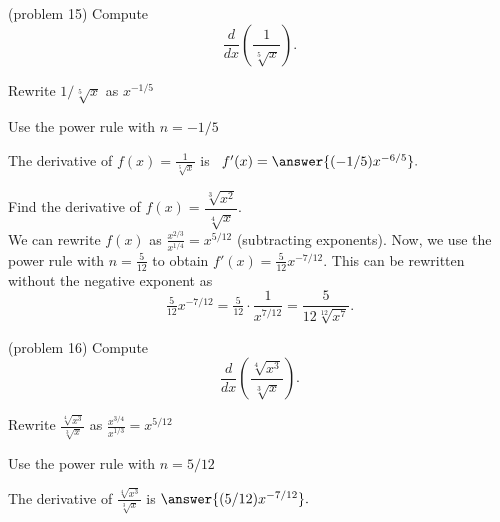 \documentclass{ximera}
\begin{document}
\begin{problem}(problem 15)
Compute
\[
\frac{d}{dx} \left(\frac{1}{\sqrt[5] x}\right).
\]
\begin{hint}
Rewrite $1/\sqrt[5] x$ as $x^{-1/5}$
\end{hint}
\begin{hint}
Use the power rule with $n = -1/5$
\end{hint}
The derivative of $f(x) = \frac{1}{\sqrt[5] x}$ is \ $f'(x) = \answer{(-1/5) x^{-6/5}}.$
\end{problem}




\begin{example}[example 16]
Find the derivative of $f(x) = \dfrac{\sqrt[3] {x^2}}{\sqrt[4] x}.$\\
We can rewrite $f(x)$ as $\frac{x^{2/3}}{x^{1/4}} = x^{5/12}$ 
(subtracting exponents). Now, we use the power rule with $n = \frac{5}{12}$ to obtain $f'(x) = \tfrac{5}{12}x^{-7/12}.$
This can be rewritten without the negative exponent as
\[
\tfrac{5}{12}x^{-7/12} = \tfrac{5}{12} \cdot \frac{1}{x^{7/12}} = \frac{5}{12\sqrt[12]{x^7}}.
\]
\end{example}




\begin{problem}(problem 16)
Compute
\[
\frac{d}{dx} \left(\frac{\sqrt[4] {x^3}}{\sqrt[3] x}\right).
\]
\begin{hint}
Rewrite $\frac{\sqrt[4] {x^3}}{\sqrt[3] x}$ as $\frac{x^{3/4}}{x^{1/3}} = x^{5/12}$
\end{hint}
\begin{hint}
Use the power rule with $n = 5/12$
\end{hint}
The derivative of $\frac{\sqrt[4] {x^3}}{\sqrt[3] x}$ is $\answer{(5/12) x^{-7/12}}.$
\end{problem}




\begin{center}
\begin{foldable}
\end{foldable}
\end{center}



\begin{center}
\begin{foldable}
\end{foldable}
\end{center}
\end{document}
